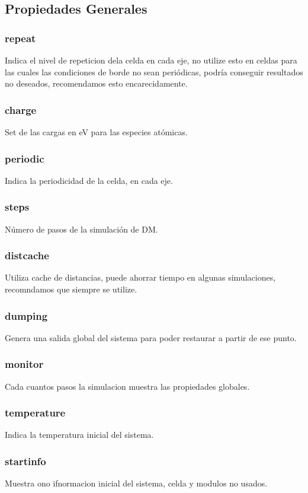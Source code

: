 \documentclass[a4paper,10pt]{scrbook}
\begin{document}
\subsection{Propiedades Generales}
\subsubsection{repeat}
Indica el nivel de repeticion dela celda en cada eje, no utilize esto en celdas para las cuales las condiciones de borde no sean peri\'odicas, podr\'ia conseguir resultados no deseados, recomendamos esto encarecidamente.
\subsubsection{charge}
Set de las cargas en eV para las especies at\'omicas.
\subsubsection{periodic}
Indica la periodicidad de la celda, en cada eje.
\subsubsection{steps}
N\'umero de pasos de la simulaci\'on de DM.
\subsubsection{distcache}
Utiliza cache de distancias, puede ahorrar tiempo en algunas simulaciones, recomndamos que siempre se utilize.
\subsubsection{dumping}
Genera una salida global del sistema para poder restaurar a partir de ese punto.
\subsubsection{monitor}
Cada cuantos pasos la simulacion muestra las propiedades globales.
\subsubsection{temperature}
Indica la temperatura inicial del sistema.
\subsubsection{startinfo}
Muestra ono ifnormacion inicial del sistema, celda y modulos no usados.
\end{document}
